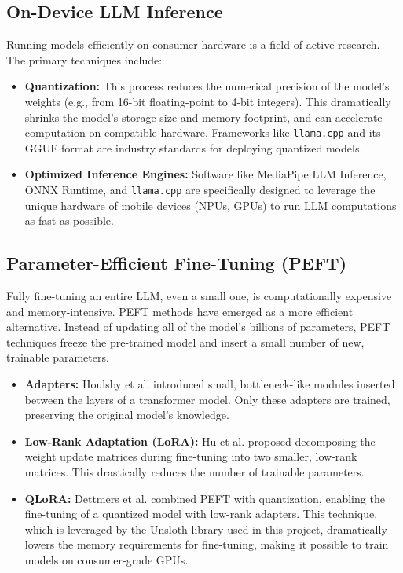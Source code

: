 \documentclass[conference]{IEEEtran}
\begin{document}
\subsection{On-Device LLM Inference}
Running models efficiently on consumer hardware is a field of active research. The primary techniques include:
\begin{itemize}
    \item \textbf{Quantization:} This process reduces the numerical precision of the model's weights (e.g., from 16-bit floating-point to 4-bit integers). This dramatically shrinks the model's storage size and memory footprint, and can accelerate computation on compatible hardware. Frameworks like \texttt{llama.cpp} and its GGUF format are industry standards for deploying quantized models.
    \item \textbf{Optimized Inference Engines:} Software like MediaPipe LLM Inference, ONNX Runtime, and \texttt{llama.cpp} are specifically designed to leverage the unique hardware of mobile devices (NPUs, GPUs) to run LLM computations as fast as possible.
\end{itemize}

\subsection{Parameter-Efficient Fine-Tuning (PEFT)}
Fully fine-tuning an entire LLM, even a small one, is computationally expensive and memory-intensive. PEFT methods have emerged as a more efficient alternative. Instead of updating all of the model's billions of parameters, PEFT techniques freeze the pre-trained model and insert a small number of new, trainable parameters.
\begin{itemize}
    \item \textbf{Adapters:} Houlsby et al. \cite{houlsby2019parameter} introduced small, bottleneck-like modules inserted between the layers of a transformer model. Only these adapters are trained, preserving the original model's knowledge.
    \item \textbf{Low-Rank Adaptation (LoRA):} Hu et al. \cite{hu2021lora} proposed decomposing the weight update matrices during fine-tuning into two smaller, low-rank matrices. This drastically reduces the number of trainable parameters.
    \item \textbf{QLoRA:} Dettmers et al. \cite{dettmers2023qlora} combined PEFT with quantization, enabling the fine-tuning of a quantized model with low-rank adapters. This technique, which is leveraged by the Unsloth library used in this project, dramatically lowers the memory requirements for fine-tuning, making it possible to train models on consumer-grade GPUs.
\end{itemize}
\end{document}
